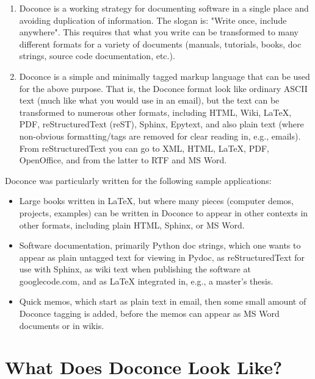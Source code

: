 \documentclass{article}
\begin{document}
\begin{enumerate}
 \item Doconce is a working strategy for documenting software in a single
    place and avoiding duplication of information. The slogan is:
    "Write once, include anywhere". This requires that what you write
    can be transformed to many different formats for a variety of
    documents (manuals, tutorials, books, doc strings, source code
    documentation, etc.).

 \item Doconce is a simple and minimally tagged markup language that can
    be used for the above purpose. That is, the Doconce format look
    like ordinary ASCII text (much like what you would use in an
    email), but the text can be transformed to numerous other formats,
    including HTML, Wiki, {\LaTeX}, PDF, reStructuredText (reST), Sphinx,
    Epytext, and also plain text (where non-obvious formatting/tags are
    removed for clear reading in, e.g., emails). From reStructuredText
    you can go to XML, HTML, {\LaTeX}, PDF, OpenOffice, and from the
    latter to RTF and MS Word.
\end{enumerate}

\noindent
Doconce was particularly written for the following sample applications:

\begin{itemize}
  \item Large books written in {\LaTeX}, but where many pieces (computer demos,
    projects, examples) can be written in Doconce to appear in other
    contexts in other formats, including plain HTML, Sphinx, or MS Word.

  \item Software documentation, primarily Python doc strings, which one wants
    to appear as plain untagged text for viewing in Pydoc, as reStructuredText
    for use with Sphinx, as wiki text when publishing the software at
    googlecode.com, and as {\LaTeX} integrated in, e.g., a master's thesis.

  \item Quick memos, which start as plain text in email, then some small
    amount of Doconce tagging is added, before the memos can appear as
    MS Word documents or in wikis.
\end{itemize}

\noindent


\section{What Does Doconce Look Like?}
\end{document}
